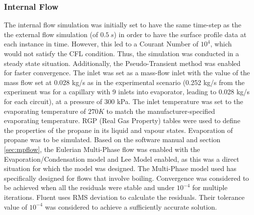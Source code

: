 \documentclass[11pt,a4paper,twoside,oneside]{article}
\begin{document}
\subsubsection{Internal Flow}\label{sec:internalsolv}
\vspace{0.3cm}
The internal flow simulation was initially set to have the same time-step as the the external flow simulation (of $0.5\ s$) in order to have the surface profile data at each instance in time. However, this led to a Courant Number of $10^4$, which would not satisfy the CFL condition\cite{cfl}. Thus, the simulation was conducted in a steady state situation. Additionally, the Pseudo-Transient method was enabled for faster convergence{\cite{fluth}}. The inlet was set as a mass-flow inlet with the value of the mass flow set at 0.028 kg/s as in the experimental scenario (0.252 kg/s from the experiment was for a capillary with 9 inlets into evaporator, leading to 0.028 kg/s for each circuit), at a pressure of 300 kPa. The inlet temperature was set to the evaporating temperature of $270K$ to match the manufacturer-specified evaporating temperature. RGP (Real Gas Property) tables were used to define the properties of the propane in its liquid and vapour states. Evaporation of propane was to be simulated. Based on the software manual\cite{flug}\cite{fluth} and section \ref{sec:mpflow}, the Eulerian Multi-Phase flow was enabled with the Evaporation/Condensation model and Lee Model enabled, as this was a direct situation for which the model was designed. The Multi-Phase model used has specifically designed for flows that involve boiling\cite{leemodel}. Convergence was considered to be achieved when all the residuals were stable and under $10^{-4}$ for multiple iterations. Fluent uses RMS deviation to calculate the residuals. Their tolerance value of $10^{-4}$ was considered to  achieve a sufficiently accurate solution\cite{convergence}. %
\end{document}
